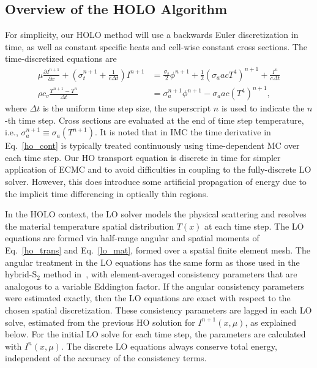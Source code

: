 \documentclass[12pt]{article}
\newcommand{\pderiv}[2]{\frac{\partial #1}{\partial #2}}
\begin{document}
\begin{center}
\section{Overview of the HOLO Algorithm}

For simplicity, our HOLO method will use a backwards Euler discretization in time, as
well as constant specific heats and cell-wise constant cross sections. The time-discretized
equations are
\begin{align}
    \mu \pderiv{I^{n+1}}{x} + \left(\sigma_t^{n+1} + \frac{1}{c \Delta t }\right) I^{n+1}
&= \frac{\sigma_s}{2} \phi^{n+1} +\frac{1}{2} \left(\sigma_a a c T^4 \right)^{n+1} + \frac{I^n}{c \Delta t} \label{ho_trans} \\
\rho c_v \frac{T^{n+1} - T^n}{\Delta t} &= \sigma_a^{n+1} \phi^{n+1}
- \sigma_a a c (T^4)^{n+1} \label{lo_mat},
\end{align}
where $\Delta t$ is the uniform time step size, the superscript $n$ is used to indicate
the $n$-th time step. Cross sections are evaluated at the end of time step
temperature, i.e., $\sigma_a^{n+1}\equiv\sigma_a(T^{n+1})$. It is noted that in IMC the time derivative in
Eq.~\eqref{ho_cont} is typically treated continuously using time-dependent MC over each
time step.  Our HO transport equation is
discrete in time for simpler application of ECMC and to avoid difficulties in coupling to the
fully-discrete LO solver.  However, this does introduce some artificial propagation of
energy due to the implicit time differencing in optically thin regions. 

In the HOLO context, the LO solver models the physical scattering and
resolves the material temperature spatial distribution $T(x)$ at each time step.  The LO equations are formed via half-range 
angular and spatial moments of
Eq.~\eqref{ho_trans} and Eq.~\eqref{lo_mat}, formed over a spatial finite element
mesh.  The angular treatment in the LO equations has the same form as those used in the
hybrid-S$_2$ method in~\cite{wolters},  with
element-averaged consistency parameters that are analogous to a variable
Eddington factor.  If the angular consistency parameters were estimated exactly, then the LO equations are exact with respect to the chosen
spatial discretization.  These consistency parameters are lagged in each LO solve,
estimated from the previous HO solution for $I^{n+1}(x,\mu)$, as explained below. For
the initial LO solve for each time step, the parameters are calculated with
$I^{n}(x,\mu)$.  The discrete LO equations always conserve total energy, independent of the accuracy of the consistency terms.


\end{center}
\end{document}
